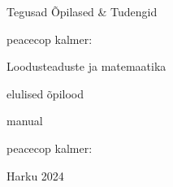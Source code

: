 \begin{titlepage}
\par{Tegusad Õpilased \& Tudengid}
\vspace{0.3\textheight}
\par{peacecop kalmer:}
\LARGE
\par{Loodusteaduste ja matemaatika}
\par{elulised õpilood}
\normalsize
\par{manual}
\vspace{0.3\textheight}
\begin{flushright}
\par{peacecop kalmer:}
\end{flushright}
\vfill
Harku
\hfill
2024
\end{titlepage}
